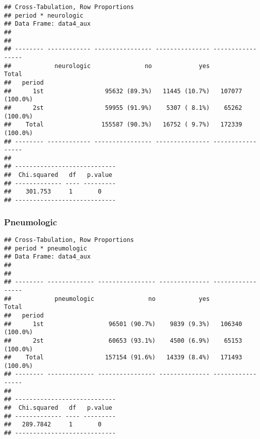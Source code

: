 \documentclass[
]{article}
\newenvironment{Shaded}{\begin{snugshade}}{\end{snugshade}}
\newcommand{\DataTypeTok}[1]{\textcolor[rgb]{0.13,0.29,0.53}{#1}}
\newcommand{\KeywordTok}[1]{\textcolor[rgb]{0.13,0.29,0.53}{\textbf{#1}}}
\newcommand{\NormalTok}[1]{#1}
\newcommand{\OperatorTok}[1]{\textcolor[rgb]{0.81,0.36,0.00}{\textbf{#1}}}
\newcommand{\OtherTok}[1]{\textcolor[rgb]{0.56,0.35,0.01}{#1}}
\newcommand{\StringTok}[1]{\textcolor[rgb]{0.31,0.60,0.02}{#1}}
\begin{document}
\begin{verbatim}
## Cross-Tabulation, Row Proportions  
## period * neurologic  
## Data Frame: data4_aux  
## 
## 
## -------- ------------ ---------------- --------------- -----------------
##            neurologic               no             yes             Total
##   period                                                                
##      1st                 95632 (89.3%)   11445 (10.7%)   107077 (100.0%)
##      2st                 59955 (91.9%)    5307 ( 8.1%)    65262 (100.0%)
##    Total                155587 (90.3%)   16752 ( 9.7%)   172339 (100.0%)
## -------- ------------ ---------------- --------------- -----------------
## 
## ----------------------------
##  Chi.squared   df   p.value 
## ------------- ---- ---------
##    301.753     1       0    
## ----------------------------
\end{verbatim}

\hypertarget{pneumologic}{%
\subsubsection{Pneumologic}\label{pneumologic}}

\begin{Shaded}
\end{Shaded}

\begin{verbatim}
## Cross-Tabulation, Row Proportions  
## period * pneumologic  
## Data Frame: data4_aux  
## 
## 
## -------- ------------- ---------------- -------------- -----------------
##            pneumologic               no            yes             Total
##   period                                                                
##      1st                  96501 (90.7%)    9839 (9.3%)   106340 (100.0%)
##      2st                  60653 (93.1%)    4500 (6.9%)    65153 (100.0%)
##    Total                 157154 (91.6%)   14339 (8.4%)   171493 (100.0%)
## -------- ------------- ---------------- -------------- -----------------
## 
## ----------------------------
##  Chi.squared   df   p.value 
## ------------- ---- ---------
##   289.7842     1       0    
## ----------------------------
\end{verbatim}
\end{document}
